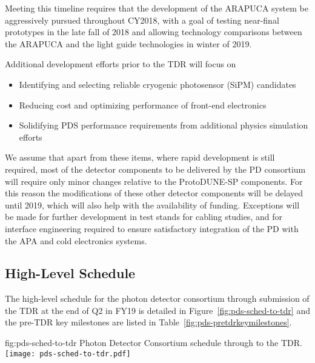 Meeting this timeline requires that the development of the ARAPUCA system be aggressively pursued throughout CY2018, with a goal of testing near-final prototypes in the late fall of \num{2018} and allowing technology comparisons between the ARAPUCA and the light guide technologies in winter of \num{2019}.

Additional development efforts prior to the TDR will focus on

\begin{itemize}
\item Identifying and selecting reliable cryogenic photosensor (SiPM) candidates
\item Reducing cost and optimizing performance of front-end electronics
\item Solidifying PDS performance requirements from additional physics simulation efforts
\end{itemize}

We assume that apart from these items, where rapid development is still required, most of the detector components to be delivered by the PD consortium will require only minor changes relative to the ProtoDUNE-SP components. For this reason the modifications of these other detector components will be delayed until \num{2019}, which will also help with the availability of funding. Exceptions will be made for further development in test stands for cabling studies, and for interface engineering required to ensure satisfactory integration of the PD with the APA and cold electronics systems.


\subsection{High-Level Schedule}
\label{sec:fdsp-pd-org-cs}

The high-level schedule for the photon detector consortium through submission of the TDR at the end of Q2 in FY19 is detailed in Figure~\ref{fig:pds-sched-to-tdr} and the pre-TDR key milestones are listed in Table~\ref{fig:pds-pretdrkeymilestones}.

\begin{dunefigure}{fig:pds-sched-to-tdr}
{Photon Detector Consortium schedule through to the TDR.}
 \texttt{[image: pds-sched-to-tdr.pdf]}
\end{dunefigure}



